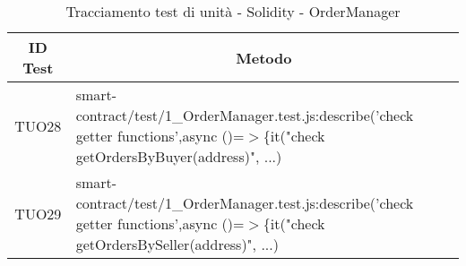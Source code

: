 \begin{table}[H]
  \centering
  \renewcommand{\arraystretch}{1.8}
  \begin{tabular}{c|p{15cm}}
    \rowcolor[HTML]{125E28}
    \color[HTML]{FFFFFF}\textbf{ID Test}
          & \multicolumn{1}{c}{\color[HTML]{FFFFFF}\textbf{Metodo}}                                                                                          \\
    \hline
    TUO28 & smart-contract/test/1\_OrderManager.test.js:describe('check getter functions',\newline async ()=$>$\{it("check getOrdersByBuyer(address)", ...)  \\
    TUO29 & smart-contract/test/1\_OrderManager.test.js:describe('check getter functions',\newline async ()=$>$\{it("check getOrdersBySeller(address)", ...) \\
  \end{tabular}
  \caption{Tracciamento test di unità - Solidity - OrderManager}
\end{table}
